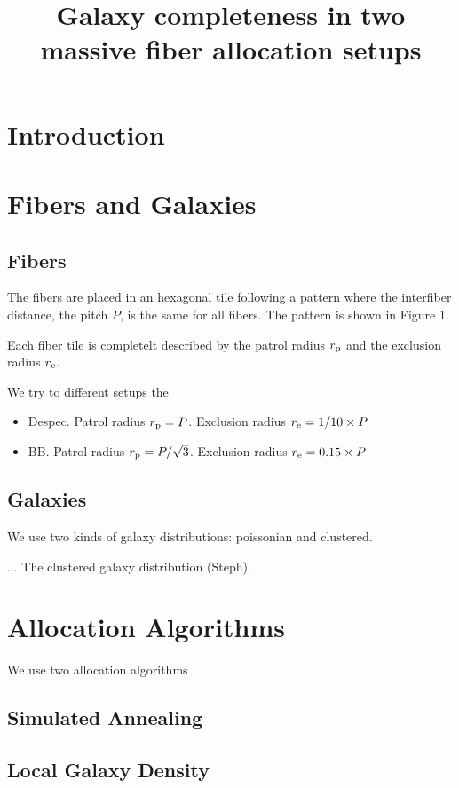 \documentclass{article}
\title{Galaxy completeness in two massive fiber allocation setups}
\begin{document}
\maketitle
\section{Introduction}

\section{Fibers and Galaxies}

\subsection{Fibers}

The fibers are placed in an hexagonal tile following a pattern where
the interfiber distance, the pitch $P$, is the same for all
fibers. The pattern is shown in Figure 1. 

Each fiber tile is completelt described by the patrol radius $r_{\rm
  p}$ and the exclusion radius $r_{\rm e}$.


We try to different setups the 
\begin{itemize}
\item {\rm Despec}. Patrol radius $r_{\rm p}=P$. Exclusion radius
  $r_{\rm e}=1/10\times P$
\item {\rm BB}. Patrol radius $r_{\rm p}=P/\sqrt{3}$. Exclusion radius
  $r_{\rm e}=0.15 \times P$
\end{itemize}

\subsection{Galaxies}
We use two kinds of galaxy distributions: poissonian and clustered. 

... The clustered galaxy distribution (Steph).

\section{Allocation Algorithms}

We use two allocation algorithms

\subsection{Simulated Annealing}


\subsection{Local Galaxy Density}
\end{document}
